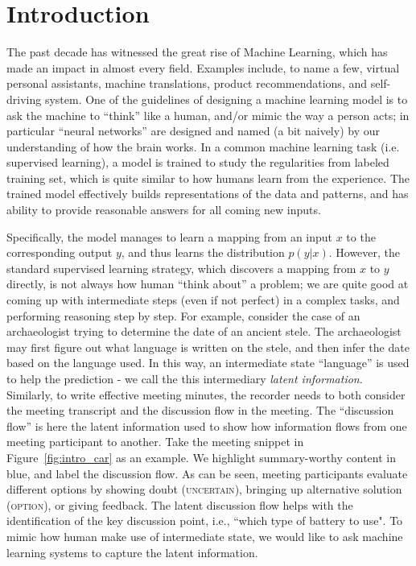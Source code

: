 \chapter{Introduction} \label{sec:ch-1}

The past decade has witnessed the great rise of Machine Learning, which has made an impact in almost every field. Examples include, to name a few, virtual personal assistants, machine translations, product recommendations, and self-driving system. One of the guidelines of designing a machine learning model is to ask the machine to ``think'' like a human, and/or mimic the way a person acts; in particular ``neural networks'' are designed and named (a bit naively) by our understanding of how the brain works. In a common machine learning task (i.e. supervised learning), a model is trained to study the regularities from labeled training set, which is quite similar to how humans learn from the experience. The trained model effectively builds representations of the data and patterns, and has ability to provide reasonable answers for all coming new inputs. 

Specifically, the model manages to learn a mapping from an input $x$ to the corresponding output $y$, and thus learns the distribution $p(y|x)$. However, the standard supervised learning strategy, which discovers a mapping from $x$ to $y$ directly, is not always how human ``think about'' a problem; we are quite good at coming up with intermediate steps (even if not perfect) in a complex tasks, and performing reasoning step by step. For example, consider the case of an archaeologist trying to determine the date of an ancient stele. The archaeologist may first figure out what language is written on the stele, and then infer the date based on the language used. In this way, an intermediate state ``language'' is used to help the prediction - we call the this intermediary \emph{latent information}. Similarly, to write effective meeting minutes, the recorder needs to both consider the meeting transcript and the discussion flow in the meeting. The ``discussion flow'' is here the latent information used to show how information flows from one meeting participant to another. Take the meeting snippet in Figure~\ref{fig:intro_car} as an example. We highlight summary-worthy content in blue, and label the discussion flow. As can be seen, meeting participants evaluate different options by showing doubt (\textsc{uncertain}), bringing up alternative solution (\textsc{option}), or giving feedback. The latent discussion flow helps with the identification of the key discussion point, i.e., ``which type of battery to use". To mimic how human make use of intermediate state, we would like to ask machine learning systems to capture the latent information.

